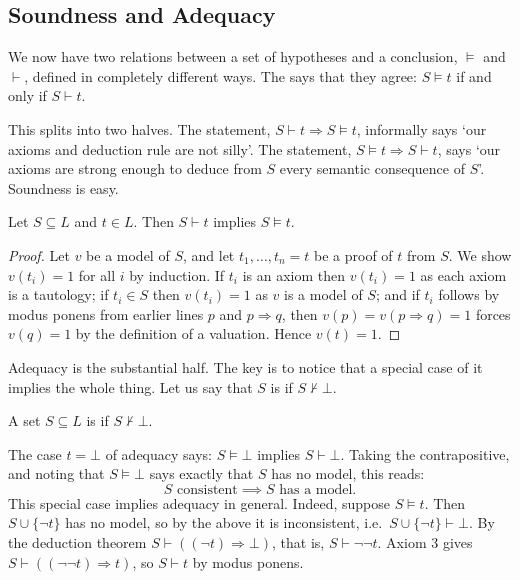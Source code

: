 \subsection{Soundness and Adequacy}

We now have two relations between a set of hypotheses and a conclusion, $\models$ and $\vdash$, defined in completely different ways. The  says that they agree: $S \models t$ if and only if $S \vdash t$.

This splits into two halves. The  statement, $S \vdash t \Rightarrow S \models t$, informally says `our axioms and deduction rule are not silly'. The  statement, $S \models t \Rightarrow S \vdash t$, says `our axioms are strong enough to deduce from $S$ every semantic consequence of $S$'. Soundness is easy.

\begin{proposition}[Soundness]
  Let $S \subseteq L$ and $t \in L$. Then $S \vdash t$ implies $S \models t$.
\end{proposition}
\begin{proof}
  Let $v$ be a model of $S$, and let $t_1, \dots, t_n = t$ be a proof of $t$ from $S$. We show $v(t_i) = 1$ for all $i$ by induction. If $t_i$ is an axiom then $v(t_i) = 1$ as each axiom is a tautology; if $t_i \in S$ then $v(t_i) = 1$ as $v$ is a model of $S$; and if $t_i$ follows by modus ponens from earlier lines $p$ and $p \Rightarrow q$, then $v(p) = v(p \Rightarrow q) = 1$ forces $v(q) = 1$ by the definition of a valuation. Hence $v(t) = 1$.
\end{proof}

Adequacy is the substantial half. The key is to notice that a special case of it implies the whole thing. Let us say that $S$ is  if $S \not\vdash \bot$.

\begin{definition}[Consistent]
  A set $S \subseteq L$ is  if $S \not\vdash \bot$.
\end{definition}

The case $t = \bot$ of adequacy says: $S \models \bot$ implies $S \vdash \bot$. Taking the contrapositive, and noting that $S \models \bot$ says exactly that $S$ has no model, this reads:
$$
\text{$S$ consistent} \implies \text{$S$ has a model.}
$$
This special case implies adequacy in general. Indeed, suppose $S \models t$. Then $S \cup \{\lnot t\}$ has no model, so by the above it is inconsistent, i.e.\ $S \cup \{\lnot t\} \vdash \bot$. By the deduction theorem $S \vdash ((\lnot t) \Rightarrow \bot)$, that is, $S \vdash \lnot \lnot t$. Axiom 3 gives $S \vdash ((\lnot\lnot t) \Rightarrow t)$, so $S \vdash t$ by modus ponens.

